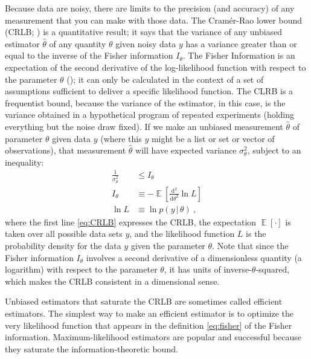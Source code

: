 \documentclass[modern]{aastex631}
\DeclareMathOperator{\E}{\mathbb{E}}
\newcommand{\dd}{\mathrm{d}}
\newcommand{\given}{\,|\,}
\begin{document}
Because data are noisy, there are limits to the precision (and accuracy) of any measurement that you can make with those data.
The Cram\'er-Rao lower bound (CRLB; \citealt{crlb}) is a quantitative result; it says that the variance of any unbiased estimator $\widehat{\theta}$ of any quantity $\theta$ given noisy data $y$ has a variance greater than or equal to the inverse of the Fisher information $I_\theta$.
The Fisher Information is an expectation of the second derivative of the log-likelihood function with respect to the parameter $\theta$ (\citealt{fisher}); it can only be calculated in the context of a set of assumptions sufficient to deliver a specific likelihood function.
The CLRB is a frequentist bound, because the variance of the estimator, in this case, is the variance obtained in a hypothetical program of repeated experiments (holding everything but the noise draw fixed).
If we make an unbiased measurement $\widehat{\theta}$ of parameter $\theta$ given data $y$ (where this $y$ might be a list or set or vector of observations), that measurement $\widehat{\theta}$ will have expected variance $\sigma_\theta^2$, subject to an inequality:
\begin{align}
    \frac{1}{\sigma_\theta^2} &\leq I_\theta\label{eq:CRLB}\\
    I_\theta &\equiv -\E\left[\frac{\dd^2}{\dd\theta^2}\ln L\right]\label{eq:fisher}\\
    \ln L &\equiv \ln p(y\given\theta)~,
\end{align}
where the first line \eqref{eq:CRLB} expresses the CRLB,
the expectation $\E[\cdot]$ is taken over all possible data sets $y$,
and the likelihood function $L$ is the probability density for the data $y$ given the parameter $\theta$.
Note that since the Fisher information $I_\theta$ involves a second derivative of a dimensionless quantity (a logarithm) with respect to the parameter $\theta$, it has units of inverse-$\theta$-squared, which makes the CRLB consistent in a dimensional sense.

Unbiased estimators that saturate the CRLB are sometimes called efficient estimators.
The simplest way to make an efficient estimator is to optimize the very likelihood function that appears in the definition \eqref{eq:fisher} of the Fisher information.
Maximum-likelihood estimators are popular and successful because they saturate the information-theoretic bound.
\end{document}

